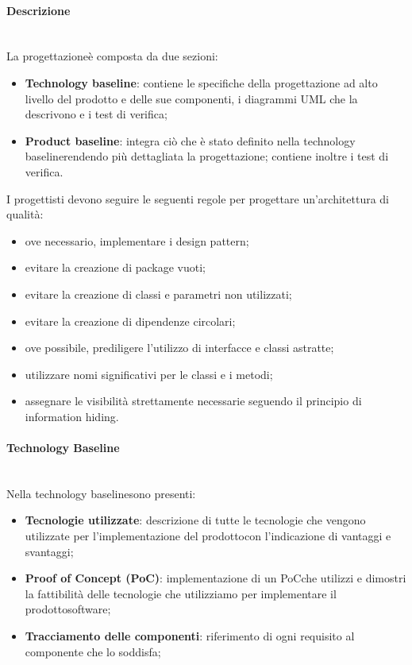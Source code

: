			\paragraph*{Descrizione}\mbox{}\\ [1mm]
			La progettazione\glosp è composta da due sezioni:
			\begin{itemize}
				\item \textbf{Technology baseline\glo}: contiene le specifiche della progettazione ad alto livello del prodotto e delle sue componenti, i diagrammi UML che la descrivono e i test di verifica;
				\item \textbf{Product baseline\glo}: integra ciò che è stato definito nella technology baseline\glosp rendendo più dettagliata la progettazione; contiene inoltre i test di verifica.	
			\end{itemize}
			I progettisti devono seguire le seguenti regole per progettare un'architettura di qualità:
			\begin{itemize}
				\item ove necessario, implementare i design pattern\glo;
				\item evitare la creazione di package vuoti;
				\item evitare la creazione di classi e parametri non utilizzati;
				\item evitare la creazione di dipendenze circolari;
				\item ove possibile, prediligere l'utilizzo di interfacce e classi astratte;
				\item utilizzare nomi significativi per le classi e i metodi;
				\item assegnare le visibilità strettamente necessarie seguendo il principio di information hiding.
			\end{itemize}
			
			\paragraph*{Technology Baseline}\mbox{}\\ [1mm]
			Nella technology baseline\glosp sono presenti:
			\begin{itemize}
				\item \textbf{Tecnologie utilizzate}: descrizione di tutte le tecnologie che vengono utilizzate per l'implementazione del prodotto\glosp con l'indicazione di vantaggi e svantaggi;
				\item \textbf{Proof of Concept (PoC)}: implementazione di un PoC\glosp che utilizzi e dimostri la fattibilità delle tecnologie che utilizziamo per implementare il prodotto\glosp software;
				\item \textbf{Tracciamento delle componenti}: riferimento di ogni requisito al componente che lo soddisfa;
			\end{itemize}
